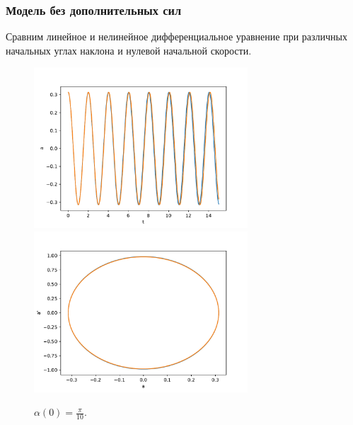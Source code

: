         \subsubsection{Модель без дополнительных сил}
            Сравним линейное и нелинейное дифференциальное уравнение при различных начальных углах наклона и нулевой начальной скорости.

            \begin{figure}[H]
                \centering
                \includegraphics[width=8cm]{pictures/12resonance10.pdf}
                \includegraphics[width=8cm]{pictures/12resonance10p.pdf}
                \caption{$\alpha(0) = \frac{\pi}{10}$.} \label{pi10}
            \end{figure}

